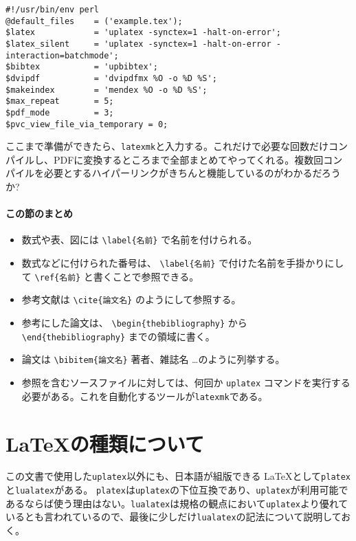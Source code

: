 \begin{reidai}
    \begin{verbatim}
#!/usr/bin/env perl
@default_files    = ('example.tex');
$latex            = 'uplatex -synctex=1 -halt-on-error';
$latex_silent     = 'uplatex -synctex=1 -halt-on-error -interaction=batchmode';
$bibtex           = 'upbibtex';
$dvipdf           = 'dvipdfmx %O -o %D %S';
$makeindex        = 'mendex %O -o %D %S';
$max_repeat       = 5;
$pdf_mode         = 3;
$pvc_view_file_via_temporary = 0;
\end{verbatim}
\end{reidai}

ここまで準備ができたら、\texttt{latexmk}と入力する。これだけで必要な回数だけコンパイルし、PDFに変換するところまで全部まとめてやってくれる。複数回コンパイルを必要とするハイパーリンクがきちんと機能しているのがわかるだろうか?

\paragraph{この節のまとめ}

\begin{itemize}
    \item 数式や表、図には \verb|\label{名前}| で名前を付けられる。
    \item 数式などに付けられた番号は、 \verb|\label{名前}| で付けた名前を手掛かりにして \verb|\ref{名前}| と書くことで参照できる。
    \item 参考文献は \verb|\cite{論文名}| のようにして参照する。
    \item 参考にした論文は、 \verb|\begin{thebibliography}| から
          \verb|\end{thebibliography}| までの領域に書く。
    \item 論文は \verb|\bibitem{論文名}| 著者、雑誌名 \dots のように列挙する。
    \item 参照を含むソースファイルに対しては、何回か \texttt{uplatex} コマンドを実行する必要がある。これを自動化するツールが\texttt{latexmk}である。
\end{itemize}

\section{\LaTeX の種類について}
この文書で使用した\texttt{uplatex}以外にも、日本語が組版できる \LaTeX として\texttt{platex}と\texttt{lualatex}がある。
\texttt{platex}は\texttt{uplatex}の下位互換であり、\texttt{uplatex}が利用可能であるならば使う理由はない。\texttt{lualatex}は規格の観点において\texttt{uplatex}より優れているとも言われているので、最後に少しだけ\texttt{lualatex}の記法について説明しておく。

